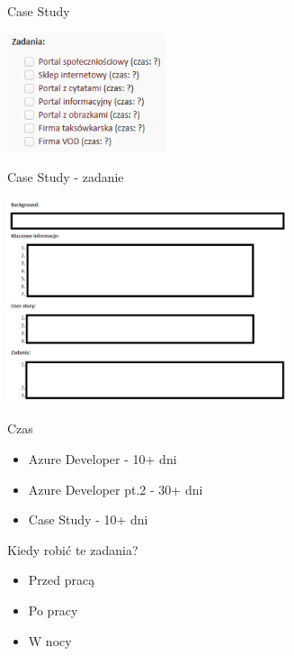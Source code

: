 \documentclass{beamer}
\begin{document}
\begin{frame}{Case Study}
	\begin{center}
		\includegraphics[height=3.5cm]{case_study.PNG}
	\end{center}
\end{frame}

\begin{frame}{Case Study - zadanie}
	\begin{center}
		\includegraphics[height=6cm]{zadanie.PNG}
	\end{center}
\end{frame}

\begin{frame}{Czas}
	\begin{huge}
		\begin{itemize}
			\item Azure Developer - 10+ dni
			\item Azure Developer pt.2 - 30+ dni
			\item Case Study - 10+ dni
		\end{itemize}
	\end{huge}
\end{frame}

\begin{frame}{}
	\begin{center}
		\Huge{Kiedy robić te zadania?}
	\end{center}
\end{frame}

\begin{frame}{}
	\begin{huge}
		\begin{itemize}
			\item Przed pracą
			\item Po pracy
			\item W nocy
		\end{itemize}
	\end{huge}
\end{frame}
\end{document}
